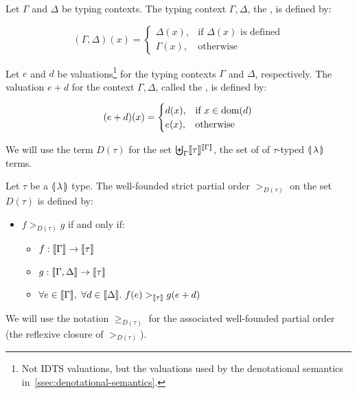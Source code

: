 \begin{notation}
  Let $\Gamma$ and $\Delta$ be typing contexts. The typing context $\Gamma,
  \Delta$, the , is defined by:

  $$
  (\Gamma,\Delta)(x) = \begin{cases}
    \Delta(x), & \text{if $\Delta(x)$ is defined} \\
    \Gamma(x), & \text{otherwise}
  \end{cases}
  $$
\end{notation}

\begin{notation}
  Let $e$ and $d$ be valuations\footnote{Not IDTS valuations, but the
    valuations used by the denotational semantics
    in~\ref{ssec:denotational-semantics}.} for the typing contexts $\Gamma$
  and $\Delta$, respectively. The valuation $e + d$ for the context
  $\Gamma, \Delta$, called the , is
  defined by:

  $$
  (e + d)(x) = \begin{cases}
    d(x), & \text{if $x \in \operatorname{dom}(d)$} \\
    e(x), & \text{otherwise}
  \end{cases}
  $$
\end{notation}

\begin{notation}
  We will use the term $D(\tau)$ for the set
  $\biguplus_\Gamma \llbracket \tau \rrbracket^{\llbracket \Gamma \rrbracket}$, the set of  of $\tau$-typed $\llparenthesis \, \lambda \, \rrparenthesis$ terms.
\end{notation}

\begin{definition}
  Let $\tau$ be a $\llparenthesis \, \lambda \, \rrparenthesis$ type. The well-founded strict partial
  order $>_{D(\tau)}$ on the set $D(\tau)$ is defined by:

  \begin{itemize}
  \item $f >_{D(\tau)} g$ if and only if:
    \begin{itemize}
    \item $f : \llbracket \Gamma \rrbracket \to \llbracket \tau \rrbracket$
    \item $g : \llbracket \Gamma,\Delta \rrbracket \to \llbracket \tau \rrbracket$
    \item $\forall e \in \llbracket \Gamma \rrbracket,\ \forall d \in \llbracket \Delta \rrbracket.\ f(e)
      >_{\llbracket \tau \rrbracket} g(e + d)$
    \end{itemize}
  \end{itemize}
  
  We will use the notation $\ge_{D(\tau)}$ for the associated well-founded
  partial order (the reflexive closure of $>_{D(\tau)}$).
\end{definition}

